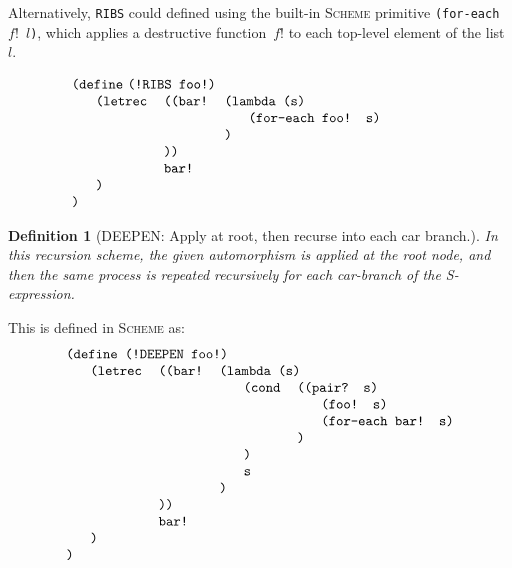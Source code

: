\documentclass[11pt]{article} %
\newcommand{\eeq}{\end{equation}}
\newcommand{\beql}[1]{\begin{equation}\label{#1}}
\newcommand{\autletter}[1]{$#1$}
\newcommand{\automorphismlet}[1]{automorphism~\autletter{#1}}
\newcommand{\proglangname}[1]{{\textsc{#1}}}
\newcommand{\scmsym}[1]{{\tt{#1}}}
\newcommand{\scmcode}[1]{{\tt{#1}}}
\newtheorem{definition}[theorem]{Definition}
\newenvironment{scmdefinefun5}{\begin{tabular}{l l l l p{5cm}}}{\end{tabular}}
\newenvironment{scmdefinefun7}{\begin{tabular}{l l l l l l l}}{\end{tabular}}
\begin{document}
Alternatively, \scmsym{RIBS} could defined using
the built-in \proglangname{Scheme} primitive \scmsym{(for-each~$f!$~$l$)},
which applies a destructive function~$f!$ to each top-level element
of the list~$l$.


\beql{definerecschemeMalt} 
\begin{scmdefinefun5}

\multicolumn{5}{l}{\scmcode{(define} \scmcode{(!RIBS foo!)}}\\
 & \scmcode{(letrec} & \scmcode{((bar!} & \multicolumn{2}{l}{\scmcode{(lambda (s)}}\\
 &                   & & & \scmcode{(for-each foo! s)}\\
 & & & \scmcode{)}\\ %
 & & \scmcode{))}\\ %
 & & \scmcode{bar!}\\ 
 & \scmcode{)}\\  %
\scmcode{)}\\ %

\end{scmdefinefun5}
\eeq

\begin{definition}[{DEEPEN: Apply at root, then recurse into each car branch.}]
\normalfont
In this recursion scheme, the given automorphism %
is applied at the root node, and then the same process
is repeated recursively for each car-branch of the S-expression.
\end{definition}

This is defined in \proglangname{Scheme} as:
\beql{definerecschemeSD0} 
\begin{scmdefinefun7}
\multicolumn{7}{l}{\scmcode{(define (!DEEPEN foo!)}}\\
 & \scmcode{(letrec} & \scmcode{((bar!} & \multicolumn{4}{l}{\scmcode{(lambda (s)}}\\
 & & & & \scmcode{(cond} & \multicolumn{2}{l}{\scmcode{((pair? s)}}\\
 & & & & & & \scmcode{(foo! s)}\\
 & & & & & & \scmcode{(for-each bar! s)}\\
 & & & & & \scmcode{)}\\ %
 & & & & \scmcode{)}\\ %
 & & & & \scmcode{s}\\
 & & & \scmcode{)}\\ %
 & & \scmcode{))}\\ %
 & & \scmcode{bar!}\\ 
 & \scmcode{)}\\  %
\scmcode{)}\\ %
\end{scmdefinefun7}
\eeq
\end{document}
